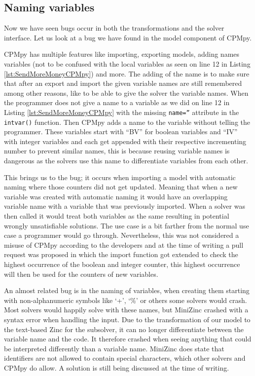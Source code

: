\subsection{Naming variables}
\label{res:bug:Naming+andImport}
Now we have seen bugs occur in both the transformations and the solver interface. Let us look at a bug we have found in the model component of CPMpy. 

CPMpy has multiple features like importing, exporting models, adding names variables (not to be confused with the local variables as seen on line 12 in Listing \ref{lst:SendMoreMoneyCPMpy}) and more. The adding of the name is to make sure that after an export and import the given variable names are still remembered among other reasons, like to be able to give the solver the variable names. When the programmer does not give a name to a variable as we did on line 12 in Listing \ref{lst:SendMoreMoneyCPMpy} with the missing \texttt{name=''} attribute in the \texttt{intvar()} function. Then CPMpy adds a name to the variable without telling the programmer. These variables start with “BV” for boolean variables and “IV” with integer variables and each get appended with their respective incrementing number to prevent similar names, this is because reusing variable names is dangerous as the solvers use this name to differentiate variables from each other.

This brings us to the bug; it occurs when importing a model with automatic naming where those counters did not get updated. Meaning that when a new variable was created with automatic naming it would have an overlapping variable name with a variable that was previously imported. When a solver was then called it would treat both variables as the same resulting in potential wrongly unsatisfiable solutions. The use case is a bit farther from the normal use case a programmer would go through. Nevertheless, this was not considered a misuse of CPMpy according to the developers and at the time of writing a pull request was proposed in which the import function got extended to check the highest occurrence of the boolean and integer counter, this highest occurrence will then be used for the counters of new variables.

An almost related bug is in the naming of variables, when creating them starting with non-alphanumeric symbols like ‘+’, ‘\%’ or others some solvers would crash. Most solvers would happily solve with these names, but MiniZinc crashed with a syntax error when handling the input. Due to the transformation of our model to the text-based Zinc for the subsolver, it can no longer differentiate between the variable name and the code. It therefore crashed when seeing anything that could be interpreted differently than a variable name. MiniZinc does state that identifiers are not allowed to contain special characters, which other solvers and CPMpy do allow. A solution is still being discussed at the time of writing.


